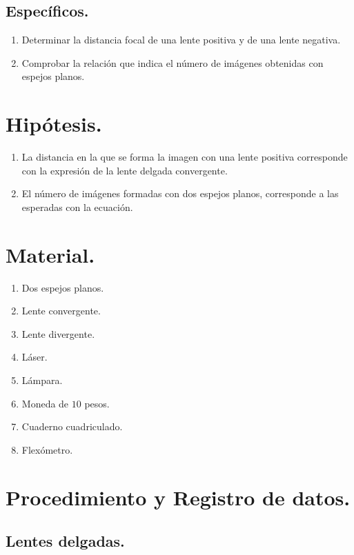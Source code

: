 \documentclass[14pt]{extarticle}
\begin{document}
\subsection{Específicos.}

\begin{enumerate}
\item Determinar la distancia focal de una lente positiva y de una lente negativa.
\item Comprobar la relación que indica el número de imágenes obtenidas con espejos planos.
\end{enumerate}

\section{Hipótesis.}

\begin{enumerate}
\item La distancia en la que se forma la imagen con una lente positiva corresponde con la expresión de la lente delgada convergente.
\item El número de imágenes formadas con dos espejos planos, corresponde a las esperadas con la ecuación.
\end{enumerate}

\section{Material.}

\begin{multicols}{2}
\begin{enumerate}
\itemsep0.15em 
\item Dos espejos planos.
\item Lente convergente.
\item Lente divergente.
\item Láser.
\item Lámpara.
\item Moneda de $10$ pesos.
\item Cuaderno cuadriculado.
\item Flexómetro.
\end{enumerate}
\end{multicols}

\section{Procedimiento y Registro de datos.}

\subsection{Lentes delgadas.}
\end{document}
